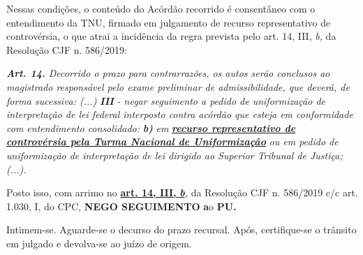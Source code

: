 \documentclass[12pt]{article}
\begin{document}
\noindent Nessas condições, o conteúdo do Acórdão recorrido é consentâneo com o entendimento da TNU, firmado em julgamento de recurso representativo de controvérsia, o que atrai a incidência da regra prevista pelo art. 14, III, \textit{b,} da Resolução CJF n. 586/2019:

\noindent \textit{\textbf{Art. 14.}}\textit{ Decorrido o prazo para contrarrazões, os autos serão conclusos ao magistrado responsável pelo exame preliminar de admissibilidade, que deverá, de forma sucessiva: (...) }\textit{\textbf{III }}\textit{- negar seguimento a pedido de uniformização de interpretação de lei federal interposto contra acórdão que esteja em conformidade com entendimento consolidado: }\textit{\textbf{b)}}\textit{ em }\uline{\textit{\textbf{recurso representativo de controvérsia pela Turma Nacional de Uniformização}}}\textit{ ou em pedido de uniformização de interpretação de lei dirigido ao Superior Tribunal de Justiça;(...).}

\noindent Posto isso, com arrimo no \uline{\textbf{art. 14, III, }}\uline{\textit{\textbf{b}}}\textit{,} da Resolução CJF n. 586/2019 c/c art. 1.030, I, do CPC, \textbf{NEGO SEGUIMENTO }\textbf{a}o\textbf{ PU}\textbf{.}

\noindent Intimem-se. Aguarde-se o decurso do prazo recursal. Após, certifique-se o trânsito em julgado e devolva-se ao juízo de origem.
\end{document}
